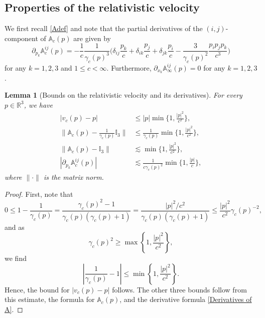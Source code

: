 \documentclass[reqno, 11pt, letterpaper]{amsart}
\newtheorem{lemma}[theorem]{Lemma}
\theoremstyle{remark}
\numberwithin{equation}{section}
\numberwithin{theorem}{section}
\numberwithin{table}{section}
\numberwithin{figure}{section}
\begin{document}
\subsection{Properties of the relativistic velocity}

We first recall \eqref{Adef} and note that the partial derivatives of the $(i,j)$-component of $\mathbb{A}_c(p)$ are given by 
\begin{equation}
\label{Derivatives of A}
    \partial_{p_k}\mathbb{A}_c^{ij}(p)=-\frac{1}{c}\frac{1}{\gamma_c(p)^3}\bigg(\delta_{ij}\frac{p_k}{c}+\delta_{ik}\frac{p_j}{c}+\delta_{jk}\frac{p_i}{c}-\frac{3}{\gamma_c(p)^2}\frac{p_i p_j p_k}{c^3}\bigg)
    \end{equation}
for any $k=1,2,3$ and $1 \leq c < \infty$.
Furthermore, $\partial_{x_k} \mathbb{A}^{ij}_\infty(p) = 0$ for any $k=1,2,3$.

\begin{lemma}[Bounds on the relativistic velocity and its derivatives]\label{lemma: bounds for the relativistic velocity and its derivatives}
For every $p \in \mathbb{R}^3$, we have
\begin{align}
|v_c(p)-p|&\leq|p|\min\bigg\{1,\frac{|p|^2}{c^2}\bigg\},\label{eq: vc asymptotic}\\
\bigg\|\mathbb{A}_c(p)-\frac{1}{\gamma_c(p)}\mathbb{I}_3\bigg\|&\leq\frac{1}{\gamma_c(p)}\min\bigg\{1,\frac{|p|^2}{c^2}\bigg\},\label{eq: Ac asymptotic}\\
\bigg\|\mathbb{A}_c(p)-\mathbb{I}_3\bigg\|&\lesssim\min\bigg\{1,\frac{|p|^2}{c^2}\bigg\},\label{eq: Ac asymptotic'}\\
|\partial_{p_k}\mathbb{A}_c^{ij}(p)|&\lesssim\frac{1}{c\gamma_c(p)^2}\min\bigg\{1,\frac{|p|}{c}\bigg\},\label{eq: Ac  derivative asymptotic}
\end{align}
where $\|\cdot\|$ is the matrix norm.
\end{lemma}

\begin{proof}
First, note that 
$$0\leq1-\frac{1}{\gamma_c(p)}=\frac{\gamma_c(p)^2-1}{\gamma_c(p)(\gamma_c(p)+1)}=\frac{|p|^2/c^2}{\gamma_c(p)(\gamma_c(p)+1)} \leq \frac{|p|^2}{c^2} \gamma_c(p)^{-2},
$$
and as $$\gamma_c(p)^2 \geq \max \left \{1, \frac{|p|^2}{c^2} \right \},$$
we find
$$\left |\frac{1}{\gamma_c(p)}-1 \right |\leq \min\left \{1,\frac{|p|^2}{c^2} \right \}.$$
Hence, the bound for $|v_c(p)-p|$ follows. The other three bounds follow from this estimate, the formula for $\mathbb{A}_c(p)$, and the derivative formula \eqref{Derivatives of A}. 
\end{proof}
\end{document}
